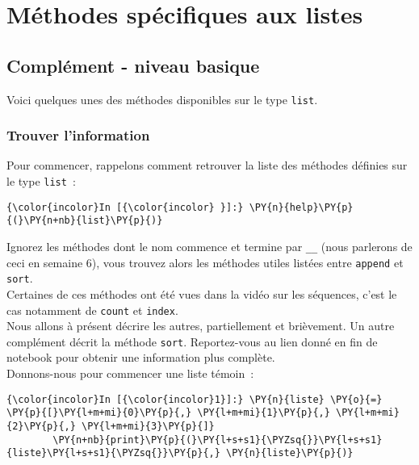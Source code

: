     \hypertarget{muxe9thodes-spuxe9cifiques-aux-listes}{%
\section{Méthodes spécifiques aux
listes}\label{muxe9thodes-spuxe9cifiques-aux-listes}}

    \hypertarget{compluxe9ment---niveau-basique}{%
\subsection{Complément - niveau
basique}\label{compluxe9ment---niveau-basique}}

    Voici quelques unes des méthodes disponibles sur le type \texttt{list}.

    \hypertarget{trouver-linformation}{%
\subsubsection{Trouver l'information}\label{trouver-linformation}}

    Pour commencer, rappelons comment retrouver la liste des méthodes
définies sur le type \texttt{list}~:

    \begin{Verbatim}[commandchars=\\\{\}]
{\color{incolor}In [{\color{incolor} }]:} \PY{n}{help}\PY{p}{(}\PY{n+nb}{list}\PY{p}{)}
\end{Verbatim}


    Ignorez les méthodes dont le nom commence et termine par \texttt{\_\_}
(nous parlerons de ceci en semaine 6), vous trouvez alors les méthodes
utiles listées entre \texttt{append} et \texttt{sort}.\\

Certaines de ces méthodes ont été vues dans la vidéo sur les séquences,
c'est le cas notamment de \texttt{count} et \texttt{index}.\\

    Nous allons à présent décrire les autres, partiellement et brièvement.
Un autre complément décrit la méthode \texttt{sort}. Reportez-vous au
lien donné en fin de notebook pour obtenir une information plus
complète.\\

    Donnons-nous pour commencer une liste témoin~:

    \begin{Verbatim}[commandchars=\\\{\}]
{\color{incolor}In [{\color{incolor}1}]:} \PY{n}{liste} \PY{o}{=} \PY{p}{[}\PY{l+m+mi}{0}\PY{p}{,} \PY{l+m+mi}{1}\PY{p}{,} \PY{l+m+mi}{2}\PY{p}{,} \PY{l+m+mi}{3}\PY{p}{]}
        \PY{n+nb}{print}\PY{p}{(}\PY{l+s+s1}{\PYZsq{}}\PY{l+s+s1}{liste}\PY{l+s+s1}{\PYZsq{}}\PY{p}{,} \PY{n}{liste}\PY{p}{)}
\end{Verbatim}


